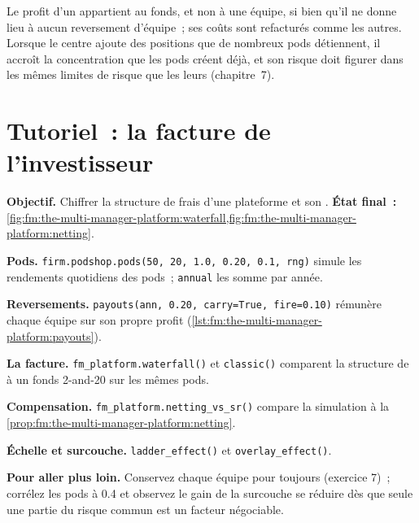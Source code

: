 \begin{remark}\label{rem:fm:the-multi-manager-platform:owner}
Le profit d'un  appartient au fonds, et non à une équipe, si bien qu'il ne donne lieu à aucun reversement d'équipe~; ses coûts sont refacturés comme les autres. Lorsque le centre
ajoute des positions que de nombreux pods détiennent, il accroît la concentration que les pods créent déjà, et son risque doit figurer dans les mêmes limites de risque que les leurs
(chapitre~7).
\end{remark}

\section{Tutoriel~: la facture de l'investisseur}\label{tut:fm:the-multi-manager-platform:tut}

\begin{tutorial}
\textbf{Objectif.} Chiffrer la structure de frais d'une plateforme et son . \textbf{État final~:}
\cref{fig:fm:the-multi-manager-platform:waterfall,fig:fm:the-multi-manager-platform:netting}.
\begin{tutsteps}
\item \textbf{Pods.} \texttt{firm.podshop.pods(50, 20, 1.0, 0.20, 0.1, rng)} simule les rendements quotidiens des pods~; \texttt{annual} les somme par année.
\item \textbf{Reversements.} \texttt{payouts(ann, 0.20, carry=True, fire=0.10)} rémunère chaque équipe sur son propre profit
(\cref{lst:fm:the-multi-manager-platform:payouts}).
\item \textbf{La facture.} \texttt{fm\_platform.waterfall()} et \texttt{classic()} comparent la structure de  à un fonds 2-and-20 sur les
mêmes pods.
\item \textbf{Compensation.} \texttt{fm\_platform.netting\_vs\_sr()} compare la simulation à la \cref{prop:fm:the-multi-manager-platform:netting}.
\item \textbf{Échelle et surcouche.} \texttt{ladder\_effect()} et \texttt{overlay\_effect()}.
\end{tutsteps}
\end{tutorial}

\textbf{Pour aller plus loin.} Conservez chaque équipe pour toujours (exercice 7)~; corrélez les pods à 0.4 et observez le gain de la surcouche se réduire dès que seule une partie
du risque commun est un facteur négociable.

